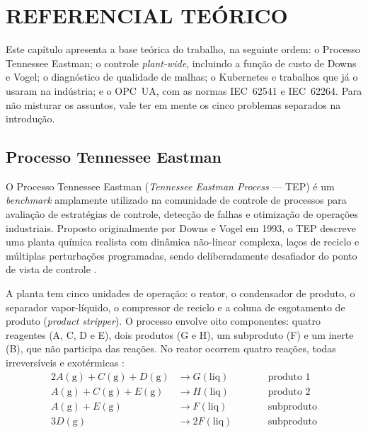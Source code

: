 \chapter[REFERENCIAL TEÓRICO]{REFERENCIAL TEÓRICO}
\label{cha:referencial}

Este capítulo apresenta a base teórica do trabalho, na seguinte ordem: o Processo Tennessee Eastman; o controle \textit{plant-wide}, incluindo a função de custo de Downs e Vogel; o diagnóstico de qualidade de malhas; o Kubernetes e trabalhos que já o usaram na indústria; e o OPC~UA, com as normas IEC~62541 e IEC~62264. Para não misturar os assuntos, vale ter em mente os cinco problemas separados na introdução.

\section{Processo Tennessee Eastman}
\label{sec:tep}

O Processo Tennessee Eastman (\textit{Tennessee Eastman Process} — TEP) é um \textit{benchmark} amplamente utilizado na comunidade de controle de processos para avaliação de estratégias de controle, detecção de falhas e otimização de operações industriais. Proposto originalmente por Downs e Vogel em 1993, o TEP descreve uma planta química realista com dinâmica não-linear complexa, laços de reciclo e múltiplas perturbações programadas, sendo deliberadamente desafiador do ponto de vista de controle \cite{DOWNS1993}.

A planta tem cinco unidades de operação: o reator, o condensador de produto, o separador vapor-líquido, o compressor de reciclo e a coluna de esgotamento de produto (\textit{product stripper}). O processo envolve oito componentes: quatro reagentes (A, C, D e E), dois produtos (G e H), um subproduto (F) e um inerte (B), que não participa das reações. No reator ocorrem quatro reações, todas irreversíveis e exotérmicas \cite{DOWNS1993}:
\begin{alignat}{2}
	A(\mathrm{g}) + C(\mathrm{g}) + D(\mathrm{g}) & \rightarrow G(\mathrm{liq})  & \qquad & \text{produto 1} \label{eq:rx1}  \\
	A(\mathrm{g}) + C(\mathrm{g}) + E(\mathrm{g}) & \rightarrow H(\mathrm{liq})  &        & \text{produto 2} \label{eq:rx2}  \\
	A(\mathrm{g}) + E(\mathrm{g})                 & \rightarrow F(\mathrm{liq})  &        & \text{subproduto} \label{eq:rx3} \\
	3D(\mathrm{g})                                & \rightarrow 2F(\mathrm{liq}) &        & \text{subproduto} \label{eq:rx4}
\end{alignat}

